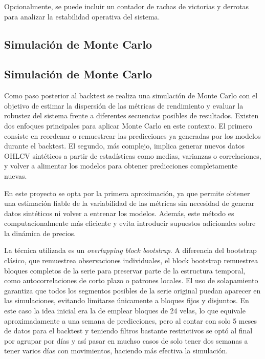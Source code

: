 Opcionalmente, se puede incluir un contador de rachas de victorias y derrotas para analizar la estabilidad operativa del sistema.

\subsection{Simulación de Monte Carlo}

\subsection{Simulación de Monte Carlo}

Como paso posterior al backtest se realiza una simulación de Monte Carlo con el objetivo de estimar la dispersión de las métricas de rendimiento y
evaluar la robustez del sistema frente a diferentes secuencias posibles de resultados. Existen dos enfoques principales para aplicar Monte Carlo en
este contexto. El primero consiste en reordenar o remuestrear las predicciones ya generadas por los modelos durante el backtest. El segundo, más
complejo, implica generar nuevos datos OHLCV sintéticos a partir de estadísticas como medias, varianzas o correlaciones, y volver a alimentar los
modelos para obtener predicciones completamente nuevas.

En este proyecto se opta por la primera aproximación, ya que permite obtener una estimación fiable de la variabilidad de las métricas sin necesidad de
generar datos sintéticos ni volver a entrenar los modelos. Además, este método es computacionalmente más eficiente y evita introducir supuestos adicionales sobre la dinámica de precios.

La técnica utilizada es un \textit{overlapping block bootstrap}. A diferencia del bootstrap clásico, que remuestrea observaciones individuales, el
block bootstrap remuestrea bloques completos de la serie para preservar parte de la estructura temporal, como autocorrelaciones de corto plazo o
patrones locales. El uso de solapamiento garantiza que todos los segmentos posibles de la serie original puedan aparecer en las simulaciones, evitando
limitarse únicamente a bloques fijos y disjuntos. En este caso la idea inicial era la de emplear bloques de 24 velas, lo que equivale aproximadamente
a una semana de predicciones, pero al contar con solo 5 meses de datos para el backtest y teniendo filtros bastante restrictivos se optó al final por
agrupar por días y así pasar en muchso casos de solo tener dos semanas a tener varios días con movimientos, haciendo más efectiva la simulación.

